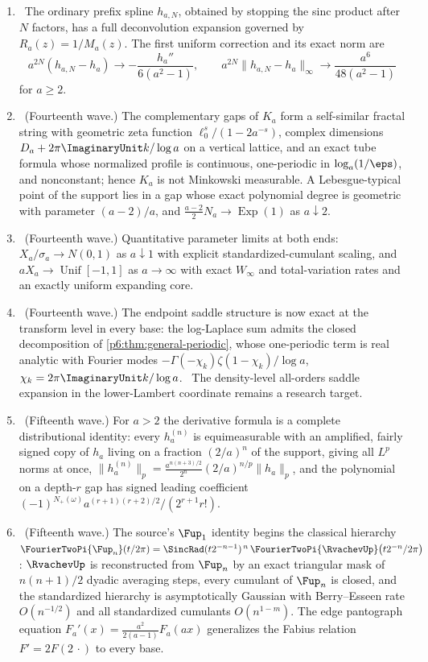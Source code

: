 \documentclass[11pt,oneside]{article}
\numberwithin{equation}{section}
\theoremstyle{definition}
\theoremstyle{remark}
\begin{document}
\begin{enumerate}
\item \newflag\ The ordinary prefix spline $h_{a,N}$, obtained by stopping the
sinc product after $N$ factors, has a full deconvolution expansion governed by
$R_a(z)=1/M_a(z)$.  The first uniform correction and its exact norm are
\[
 a^{2N}(h_{a,N}-h_a)\to-\frac{h_a''}{6(a^2-1)},
 \qquad
 a^{2N}\|h_{a,N}-h_a\|_\infty
 \to\frac{a^6}{48(a^2-1)}
\]
for $a\ge2$.

\item \newflag\ (Fourteenth wave.)  The complementary gaps of $K_a$ form a
self-similar fractal string with geometric zeta function
$\ell_0^s/(1-2a^{-s})$, complex dimensions
$D_a+2\pi\ImaginaryUnit k/\log a$ on a vertical lattice, and an exact tube formula whose
normalized profile is continuous, one-periodic in $\log_a(1/\eps)$, and
nonconstant; hence $K_a$ is not Minkowski measurable.  A Lebesgue-typical point
of the support lies in a gap whose exact polynomial degree is geometric with
parameter $(a-2)/a$, and $\tfrac{a-2}2N_a\to\operatorname{Exp}(1)$ as
$a\downarrow2$.

\item \newflag\ (Fourteenth wave.)  Quantitative parameter limits at both ends:
$X_a/\sigma_a\to N(0,1)$ as $a\downarrow1$ with explicit standardized-cumulant
scaling, and $aX_a\to\operatorname{Unif}[-1,1]$ as $a\to\infty$ with exact
$W_\infty$ and total-variation rates and an exactly uniform expanding core.

\item \newflag\ (Fourteenth wave.)  The endpoint saddle structure is now exact
at the transform level in every base: the log-Laplace sum admits the closed
decomposition of \cref{p6:thm:general-periodic}, whose one-periodic term is real
analytic with Fourier modes $-\Gamma(-\chi_k)\zeta(1-\chi_k)/\log a$,
$\chi_k=2\pi\ImaginaryUnit k/\log a$.  \conjflag\ The density-level all-orders saddle
expansion in the lower-Lambert coordinate remains a research target.

\item \newflag\ (Fifteenth wave.)  For $a>2$ the derivative formula is a
complete distributional identity: every $h_a^{(n)}$ is equimeasurable with an
amplified, fairly signed copy of $h_a$ living on a fraction $(2/a)^n$ of the
support, giving all $L^p$ norms at once,
$\|h_a^{(n)}\|_p=\tfrac{a^{n(n+3)/2}}{2^n}(2/a)^{n/p}\|h_a\|_p$, and the
polynomial on a depth-$r$ gap has signed leading coefficient
$(-1)^{N_+(\omega)}a^{(r+1)(r+2)/2}/(2^{r+1}r!)$.

\item \newflag\ (Fifteenth wave.)  The source's $\Fup_1$ identity begins the
classical hierarchy $\FourierTwoPi{\Fup_n}(t/2\pi)=\SincRad(t2^{-n-1})^{\,n}\,
\FourierTwoPi{\RvachevUp}\bigl(t2^{-n}/2\pi\bigr)$: $\RvachevUp$ is reconstructed from $\Fup_n$ by
an exact triangular mask of $n(n+1)/2$ dyadic averaging steps, every cumulant
of $\Fup_n$ is closed, and the standardized hierarchy is asymptotically
Gaussian with Berry--Esseen rate $O(n^{-1/2})$ and all standardized cumulants
$O(n^{1-m})$.  The edge pantograph equation
$F_a'(x)=\tfrac{a^2}{2(a-1)}F_a(ax)$ generalizes the Fabius relation
$F'=2F(2\,\cdot)$ to every base.


\end{enumerate}
\end{document}
